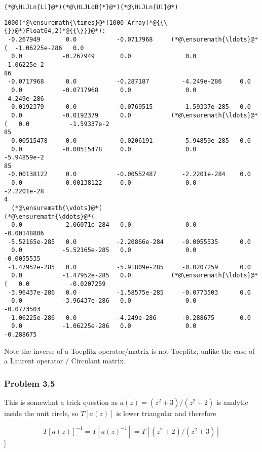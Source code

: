 \documentclass[12pt,a4paper]{article}
\newcommand{\HLJLn}[1]{#1}
\newcommand{\HLJLoB}[1]{\textcolor[RGB]{102,102,102}{\textbf{#1}}}
\begin{document}
\begin{lstlisting}
(*@\HLJLn{Li}@*)(*@\HLJLoB{*}@*)(*@\HLJLn{Ui}@*)
\end{lstlisting}

\begin{lstlisting}
1000(*@\ensuremath{\times}@*(1000 Array(*@{{\{}}@*)Float64,2(*@{{\}}}@*):
 -0.267949       0.0           -0.0717968     (*@\ensuremath{\ldots}@*(  -1.06225e-286   0.0
  0.0           -0.267949       0.0               0.0           -1.06225e-2
86
 -0.0717968      0.0           -0.287187         -4.249e-286     0.0
  0.0           -0.0717968      0.0               0.0           -4.249e-286
 -0.0192379      0.0           -0.0769515        -1.59337e-285   0.0
  0.0           -0.0192379      0.0           (*@\ensuremath{\ldots}@*(   0.0           -1.59337e-2
85
 -0.00515478     0.0           -0.0206191        -5.94859e-285   0.0
  0.0           -0.00515478     0.0               0.0           -5.94859e-2
85
 -0.00138122     0.0           -0.00552487       -2.2201e-284    0.0
  0.0           -0.00138122     0.0               0.0           -2.2201e-28
4
  (*@\ensuremath{\vdots}@*(                                           (*@\ensuremath{\ddots}@*(                 
  0.0           -2.06071e-284   0.0               0.0           -0.00148806
 -5.52165e-285   0.0           -2.20866e-284     -0.0055535      0.0
  0.0           -5.52165e-285   0.0               0.0           -0.0055535
 -1.47952e-285   0.0           -5.91809e-285     -0.0207259      0.0
  0.0           -1.47952e-285   0.0           (*@\ensuremath{\ldots}@*(   0.0           -0.0207259
 -3.96437e-286   0.0           -1.58575e-285     -0.0773503      0.0
  0.0           -3.96437e-286   0.0               0.0           -0.0773503
 -1.06225e-286   0.0           -4.249e-286       -0.288675       0.0
  0.0           -1.06225e-286   0.0               0.0           -0.288675
\end{lstlisting}


Note the inverse of a Toeplitz operator/matrix is not Toeplitz, unlike the case of a Laurent operator / Circulant matrix.

\subsubsection{Problem 3.5}
This is somewhat a trick question as $a(z) = (z^2 + 3)/ (z^2 + 2)$ is analytic inside the unit circle, so $T[a(z)]$ is lower triangular and  therefore

\[
T[a(z)]^{-1} = T[a(z)^{-1}] = T[(z^2 + 2)/(z^2+3)]
\]
]
\end{document}

